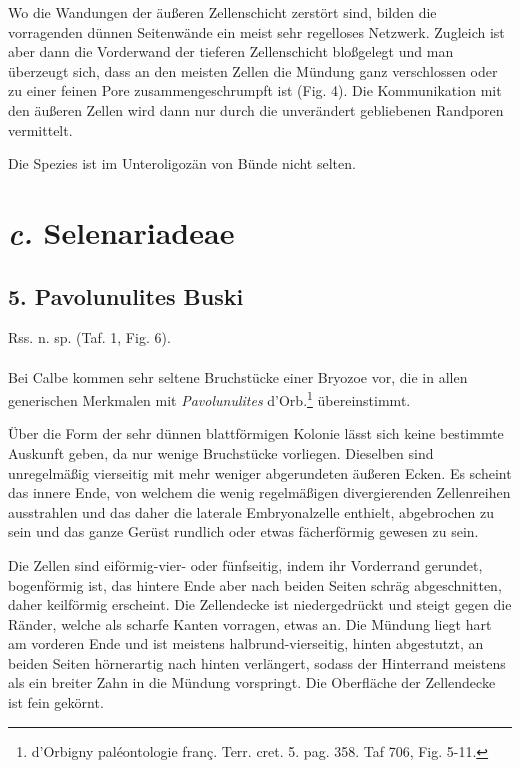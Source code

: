\documentclass[a4paper, 11pt, oneside, german]{article}
\begin{document}
Wo die Wandungen der äußeren Zellenschicht zerstört sind, bilden die vorragenden dünnen Seitenwände ein meist sehr regelloses Netzwerk. Zugleich ist aber dann die Vorderwand der tieferen Zellenschicht bloßgelegt und man überzeugt sich, dass an den meisten Zellen die Mündung ganz verschlossen oder zu einer feinen Pore zusammengeschrumpft ist (Fig. 4). Die Kommunikation mit den äußeren Zellen wird dann nur durch die unverändert gebliebenen Randporen vermittelt.

Die Spezies ist im Unteroligozän von Bünde nicht selten.
\section{\emph{c.} Selenariadeae}
\subsection{5. Pavolunulites Buski}
\begin{center}
Rss. n. sp. (Taf. 1, Fig. 6).
\end{center}
\paragraph{}
Bei Calbe kommen sehr seltene Bruchstücke einer Bryozoe vor, die in allen generischen Merkmalen mit \emph{Pavolunulites} d'Orb.\footnote{d'Orbigny paléontologie franç. Terr. cret. 5. pag. 358. Taf 706, Fig. 5-11.} übereinstimmt.

Über die Form der sehr dünnen blattförmigen Kolonie lässt sich keine bestimmte Auskunft geben, da nur wenige Bruchstücke vorliegen. Dieselben sind unregelmäßig vierseitig mit mehr weniger abgerundeten äußeren Ecken. Es scheint das innere Ende, von welchem die wenig regelmäßigen divergierenden Zellenreihen ausstrahlen und das daher die laterale Embryonalzelle enthielt, abgebrochen zu sein und das ganze Gerüst rundlich oder etwas fächerförmig gewesen zu sein.

Die Zellen sind eiförmig-vier- oder fünfseitig, indem ihr Vorderrand gerundet, bogenförmig ist, das hintere Ende aber nach beiden Seiten schräg abgeschnitten, daher keilförmig erscheint. Die Zellendecke ist niedergedrückt und steigt gegen die Ränder, welche als scharfe Kanten vorragen, etwas an. Die Mündung liegt hart am vorderen Ende und ist meistens halbrund-vierseitig, hinten abgestutzt, an beiden Seiten hörnerartig nach hinten verlängert, sodass der Hinterrand meistens als ein breiter Zahn in die Mündung vorspringt. Die Oberfläche der Zellendecke ist fein gekörnt.
\end{document}
